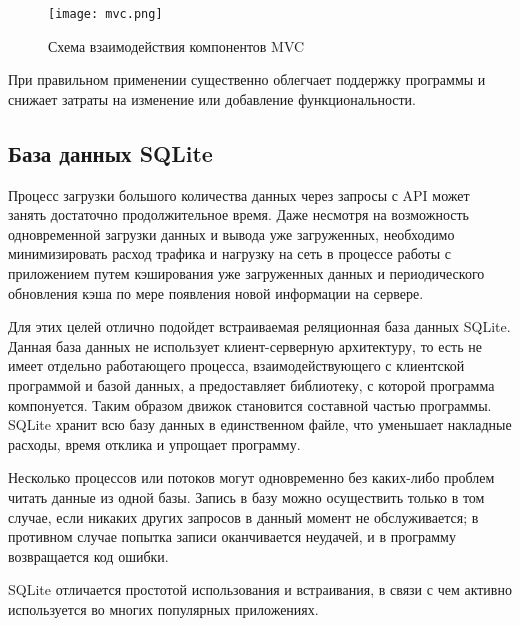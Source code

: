 \begin{figure}[h!]
\centering
\texttt{[image: mvc.png]}
\caption{Схема взаимодействия компонентов MVC}
\label{fig:mvc}
\end{figure}

При правильном применении \mvc{} существенно облегчает поддержку программы и
снижает затраты на изменение или добавление функциональности.

\subsection{База данных SQLite}
\label{sec:sqlite}
Процесс загрузки большого количества данных через запросы с API может занять
достаточно продолжительное время. Даже несмотря на возможность одновременной
загрузки данных и вывода уже загруженных, необходимо минимизировать расход
трафика и нагрузку на сеть в процессе работы с приложением путем кэширования
уже загруженных данных и периодического обновления кэша по мере появления новой
информации на сервере.

Для этих целей отлично подойдет встраиваемая реляционная база данных SQLite.
Данная база данных не использует клиент-серверную архитектуру, то есть не имеет
отдельно работающего процесса, взаимодействующего с клиентской программой и
базой данных, а предоставляет библиотеку, с которой программа компонуется. Таким
образом движок становится составной частью программы. SQLite хранит всю базу
данных в единственном файле, что уменьшает накладные расходы, время отклика и упрощает
программу.

Несколько процессов или потоков могут одновременно без каких-либо проблем читать
данные из одной базы. Запись в базу можно осуществить только в том случае, если
никаких других запросов в данный момент не обслуживается; в противном случае
попытка записи оканчивается неудачей, и в программу возвращается код ошибки.

SQLite отличается простотой использования и встраивания, в связи с чем активно
используется во многих популярных приложениях.